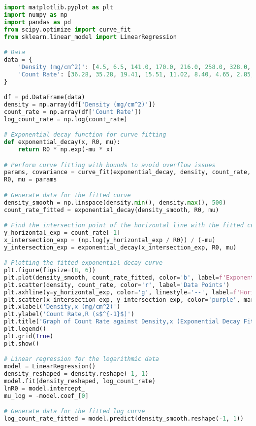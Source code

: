 \documentclass[a4paper,11pt]{article}
\begin{document}
\begin{lstlisting}[language=Python]
import matplotlib.pyplot as plt
import numpy as np
import pandas as pd
from scipy.optimize import curve_fit
from sklearn.linear_model import LinearRegression

# Data
data = {
    'Density (mg/cm^2)': [4.5, 6.5, 141.0, 170.0, 216.0, 258.0, 328.0, 425.0, 522.0, 645.0, 655.0, 840.0],
    'Count Rate': [36.28, 35.28, 19.41, 15.51, 11.02, 8.40, 4.65, 2.85, 1.60, 1.29, 1.17, 1.04]
}

df = pd.DataFrame(data)
density = np.array(df['Density (mg/cm^2)'])
count_rate = np.array(df['Count Rate'])
log_count_rate = np.log(count_rate)

# Exponential decay function for curve fitting
def exponential_decay(x, R0, mu):
    return R0 * np.exp(-mu * x)

# Perform curve fitting with bounds to avoid overflow issues
params, covariance = curve_fit(exponential_decay, density, count_rate, bounds=(0, [100, 0.01]))
R0, mu = params

# Generate data for the fitted curve
density_smooth = np.linspace(density.min(), density.max(), 500)
count_rate_fitted = exponential_decay(density_smooth, R0, mu)

# Find the intersection point of the horizontal line with the fitted curve
y_horizontal_exp = count_rate[-1]
x_intersection_exp = (np.log(y_horizontal_exp / R0)) / (-mu)
y_intersection_exp = exponential_decay(x_intersection_exp, R0, mu)

# Plotting the fitted exponential decay curve
plt.figure(figsize=(8, 6))
plt.plot(density_smooth, count_rate_fitted, color='b', label=f'Exponential Decay Fit\nR = {R0:.3f}e^(-{mu:.5f}x)')
plt.scatter(density, count_rate, color='r', label='Data Points')
plt.axhline(y=y_horizontal_exp, color='g', linestyle='--', label=f'Horizontal Line at y = {y_horizontal_exp:.3f}')
plt.scatter(x_intersection_exp, y_intersection_exp, color='purple', marker='X', label=f'Intersection Point (X): ({x_intersection_exp:.2f}, {y_intersection_exp:.2f})')
plt.xlabel('Density,x (mg/cm^2)')
plt.ylabel('Count Rate,R (s$^{-1}$)')
plt.title('Graph of Count Rate against Density,x (Exponential Decay Fit)')
plt.legend()
plt.grid(True)
plt.show()

# Linear regression for the logarithmic data
model = LinearRegression()
density_reshaped = density.reshape(-1, 1)
model.fit(density_reshaped, log_count_rate)
lnR0 = model.intercept_
mu_log = -model.coef_[0]

# Generate data for the fitted log curve
log_count_rate_fitted = model.predict(density_smooth.reshape(-1, 1))


\end{lstlisting}
\end{document}
